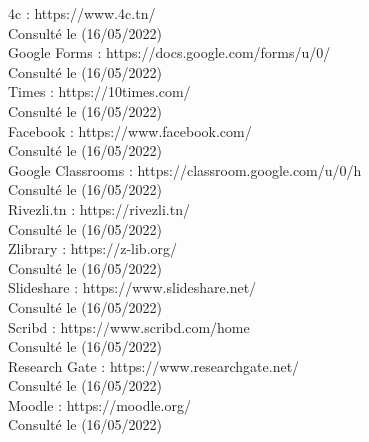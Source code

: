 \documentclass[12pt]{report}
\begin{document}
\begin{thebibliography}{99}
\bibitem 4c : https://www.4c.tn/\\Consulté le (16/05/2022)\\
\bibitem Google Forms : https://docs.google.com/forms/u/0/\\Consulté le (16/05/2022)\\
 Times : https://10times.com/\\Consulté le (16/05/2022)\\
\bibitem Facebook : https://www.facebook.com/\\Consulté le (16/05/2022)\\
\bibitem Google Classrooms : https://classroom.google.com/u/0/h\\Consulté le (16/05/2022)\\
\bibitem Rivezli.tn : https://rivezli.tn/\\Consulté le (16/05/2022)\\
\bibitem Zlibrary : https://z-lib.org/\\Consulté le (16/05/2022)\\
\bibitem Slideshare : https://www.slideshare.net/\\Consulté le (16/05/2022)\\
\bibitem Scribd : https://www.scribd.com/home\\Consulté le (16/05/2022)\\
\bibitem Research Gate : https://www.researchgate.net/\\Consulté le (16/05/2022)\\
\bibitem Moodle : https://moodle.org/\\Consulté le (16/05/2022)\\


\end{thebibliography}
\end{document}
